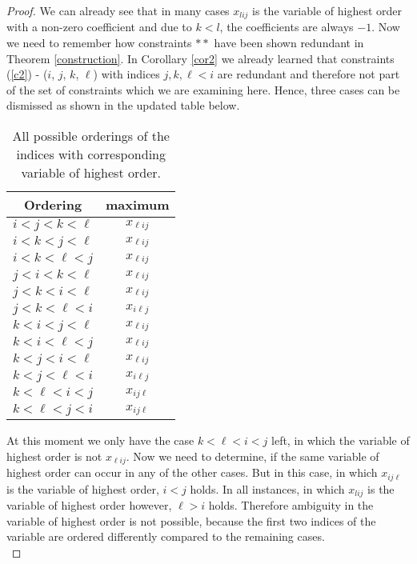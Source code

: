 \begin{proof}
	We can already see that in many cases $x_{lij}$ is the variable of highest order with a non-zero coefficient and due to $k<l$, the coefficients are always $-1$. Now we need to remember how constraints $**$ have been shown redundant in Theorem \ref{construction}. In Corollary \ref{cor2} we already learned that constraints (\ref{c2}) - ($i$, $j$, $k$, $\ell$) with indices $j, k, \ell < i$ are redundant and therefore not part of the set of constraints which we are examining here. Hence, three cases can be dismissed as shown in the updated table below. \\
	
\begin{table}[h]
	\centering
	\begin{tabular}{||c | c ||} 
		\hline
		Ordering & maximum \\ [0.5ex] 
		\hline\hline
		$i<j<k<\ell$ & $x_{\ell ij}$ \\ 
		\hline
		$i<k<j<\ell$ & $x_{\ell ij}$ \\ 
		\hline
		$i<k<\ell<j$ & $x_{\ell ij}$ \\ 
		\hline
		$j<i<k<\ell$ & $x_{\ell ij}$ \\ 
		\hline
		$j<k<i<\ell$ & $x_{\ell ij}$ \\ 
		\hline
		\cellcolor{red!75}$j<k<\ell<i$ &\cellcolor{red!75} $x_{i\ell j}$ \\ 
		\hline
		$k<i<j<\ell$ & $x_{\ell ij}$ \\ 
		\hline
		$k<i<\ell<j$ & $x_{\ell ij}$ \\ 
		\hline
		$k<j<i<\ell$ & $x_{\ell ij}$ \\ 
		\hline
		\cellcolor{red!75}$k<j<\ell<i$ &\cellcolor{red!75} $x_{i\ell j}$ \\ 
		\hline
		$k<\ell<i<j$ & $x_{ij\ell}$ \\ 
		\hline
		\cellcolor{red!75}$k<\ell<j<i$ &\cellcolor{red!75} $x_{ij\ell}$ \\ 
		\hline
	\end{tabular}
	\caption{All possible orderings of the indices with corresponding variable of highest order.}
\end{table}	
	\newpage
	At this moment we only have the case $k<\ell<i<j$ left, in which the variable of highest order is not $x_{\ell ij}$. Now we need to determine, if the same variable of highest order can occur in any of the other cases. But in this case, in which $x_{ij\ell}$ is the variable of highest order, $i < j$ holds. In all instances, in which $x_{lij}$ is the variable of highest order however, $\ell > i$ holds. Therefore ambiguity in the variable of highest order is not possible, because the first two indices of the variable are ordered differently compared to the remaining cases.\\
	

\end{proof}
